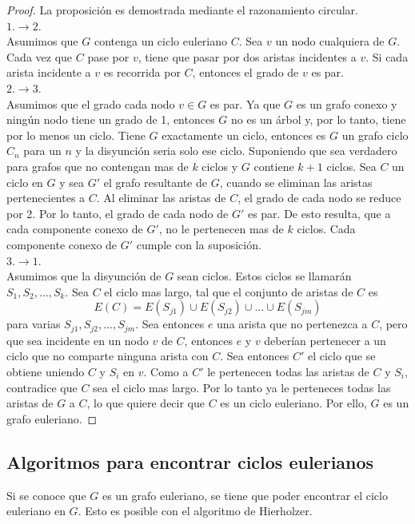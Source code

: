 \documentclass[12pt]{article}
\begin{document}
\begin{proof}
La proposición es demostrada mediante el razonamiento circular.
\\$1. \rightarrow 2.$
\\Asumimos que $G$ contenga un ciclo euleriano $C$. Sea $v$ un nodo cualquiera de $G$. Cada vez que $C$ pase por $v$, tiene que pasar por dos aristas incidentes a $v$. Si cada arista incidente a $v$ es recorrida por $C$, entonces el grado de $v$ es par.
\\$2. \rightarrow 3.$
\\Asumimos que el grado cada nodo $v \in G$ es par. Ya que $G$ es un grafo conexo y ningún nodo tiene un grado de 1, entonces $G$ no es un árbol y, por lo tanto, tiene por lo menos un ciclo. Tiene $G$ exactamente un ciclo, entonces es $G$ un grafo ciclo $C_{n}$ para un $n$ y la disyunción seria solo ese ciclo. Suponiendo que sea verdadero para grafos que no contengan mas de $k$ ciclos y $G$ contiene $k+1$ ciclos. Sea $C$ un ciclo en $G$ y sea $G'$ el grafo resultante de $G$, cuando se eliminan las aristas pertenecientes a $C$. Al eliminar las aristas de $C$, el grado de cada nodo se reduce por 2. Por lo tanto, el grado de cada nodo de $G'$ es par. De esto resulta, que a cada componente conexo de $G'$, no le pertenecen mas de $k$ ciclos. Cada componente conexo de $G'$ cumple con la suposición.
\\$3. \rightarrow 1.$
\\Asumimos que la disyunción de $G$ sean ciclos. Estos ciclos se llamarán $S_{1}, S_{2}, ..., S_{k}$. Sea $C$ el ciclo mas largo, tal que el conjunto de aristas de $C$ es $$E(C)=E(S_{j1}) \cup E(S_{j2}) \cup ... \cup E(S_{jm})$$ para varias $S_{j1}, S_{j2}, ..., S_{jm}$. Sea entonces $e$ una arista que no pertenezca a $C$, pero que sea incidente en un nodo $v$ de $C$, entonces $e$ y $v$ deberían pertenecer a un ciclo que no comparte ninguna arista con $C$. Sea entonces $C'$ el ciclo que se obtiene uniendo $C$ y $S_{i}$ en $v$. Como a $C'$ le pertenecen todas las aristas de $C$ y $S_{i}$, contradice que $C$ sea el ciclo mas largo. Por lo tanto ya le perteneces todas las aristas de $G$ a $C$, lo que quiere decir que $C$ es un ciclo euleriano. Por ello, $G$ es un grafo euleriano.
\end{proof}
\subsection{Algoritmos para encontrar ciclos eulerianos}
Si se conoce que $G$ es un grafo euleriano, se tiene que poder encontrar el ciclo euleriano en $G$. Esto es posible con el algoritmo de Hierholzer.
\end{document}
